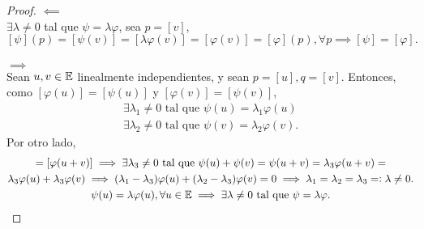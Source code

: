 \begin{proof}
    $\impliedby$ \\
    $\exists \lambda \neq 0$ tal que $\psi = \lambda\varphi$, sea $p = [v]$, $[\psi](p) = [\psi(v)] = [\lambda\varphi(v)] = [\varphi(v)] = [\varphi](p), \forall p \implies [\psi] = [\varphi].$ \\ \\
    $\implies$ \\
    Sean $u, v \in \mathbb{E}$ linealmente independientes, y sean $p = [u], q = [v]$. Entonces, como $[\varphi(u)] = [\psi(u)]$ y $[\varphi(v)] = [\psi(v)]$,
    \begin{gather*}
        \exists \lambda_1 \neq 0 \text{ tal que } \psi(u) = \lambda_1 \varphi(u) \\
        \exists \lambda_2 \neq 0 \text{ tal que } \psi(v) = \lambda_2 \varphi(v).
    \end{gather*}
    Por otro lado,
    \begin{gather*}
        [\psi(u+v)] = [\varphi(u+v)] \implies \exists \lambda_3 \neq 0 \text{ tal que } \psi(u) + \psi(v) = \psi(u+v) = \lambda_3 \varphi(u+v) = \\ \lambda_3 \varphi(u) + \lambda_3 \varphi(v) \implies (\lambda_1 - \lambda_3) \varphi(u) + (\lambda_2-\lambda_3) \varphi(v) = 0 \implies \lambda_1 = \lambda_2 = \lambda_3 =: \lambda \neq 0. \\
        \psi(u) = \lambda \varphi(u), \forall u \in \E \implies \exists \lambda \neq 0 \text{ tal que } \psi = \lambda \varphi.
    \end{gather*}
\end{proof}
